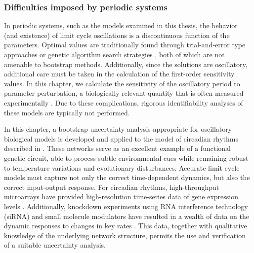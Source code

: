 \subsubsection{Difficulties imposed by periodic systems}

In periodic systems, such as the models examined in this thesis, the behavior (and existence) of limit cycle oscillations is a discontinuous function of the parameters.
Optimal values are traditionally found through trial-and-error type approaches \cite{Forger2003, Leloup2003} or genetic algorithm search strategies \cite{Mirsky2009}, both of which are not amenable to bootstrap methods. 
Additionally, since the solutions are oscillatory, additional care must be taken in the calculation of the first-order sensitivity values. 
In this chapter, we calculate the sensitivity of the oscillatory period to parameter perturbation, a biologically relevant quantity that is often measured experimentally \cite{Wilkins2009}. 
Due to these complications, rigorous identifiability analyses of these models are typically not performed.

In this chapter, a bootstrap uncertainty analysis appropriate for oscillatory biological models is developed and applied to the model of circadian rhythms described in  \cite{Hirota2012}. 
These networks serve as an excellent example of a functional genetic circuit, able to process subtle environmental cues while remaining robust to temperature variations and evolutionary disturbances. 
Accurate limit cycle models must capture not only the correct time-dependent dynamics, but also the correct input-output response. 
For circadian rhythms, high-throughput microarrays have provided high-resolution time-series data of gene expression levels \cite{Hughes2009}. 
Additionally, knockdown experiments using RNA interference technology (siRNA) and small molecule modulators have resulted in a wealth of data on the dynamic responses to changes in key rates \cite{Zhang2009, Hirota2010, Hirota2008, Hirota2012}. 
This data, together with qualitative knowledge of the underlying network structure, permits the use and verification of a suitable uncertainty analysis.

